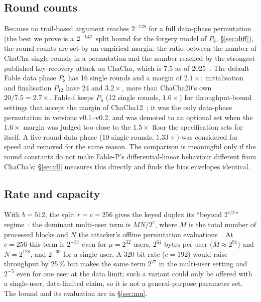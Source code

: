 \documentclass{iacrtrans}
\newcommand{\Fable}{\textsf{Fable}\xspace}
\newcommand{\FableP}{\textsf{Fable-P}\xspace}
\newcommand{\FableF}{\textsf{Fable-f}\xspace}
\newcommand{\ChaCha}{\textsf{ChaCha}\xspace}
\newcommand{\PP}[1]{P_{#1}}
\newcommand{\WrateTwo}{42}   %
\newcommand{\WuncTwo}{33}    %
\newcommand{\BoundEight}{\the\numexpr\WrateTwo+3*\WuncTwo\relax}   %
\begin{document}
\subsection{Round counts}
\label{sec:whyrounds}
Because no trail-based argument reaches $2^{-128}$ for a full data-phase permutation (the best we prove is a $2^{-\BoundEight}$ split bound for the forgery model of $\PP{8}$, \S\ref{sec:diff}), the round counts are set by an empirical margin: the ratio between the number of \ChaCha single rounds in a permutation and the number reached by the strongest published key-recovery attack on \ChaCha, which is 7.5 as of 2025~\cite{FT25,Dey24,SDSM25}. The default \Fable data phase $\PP{8}$ has 16 single rounds and a margin of $2.1\times$; initialisation and finalisation $\PP{12}$ have 24 and $3.2\times$, more than ChaCha20's own $20/7.5 = 2.7\times$. \FableF keeps $\PP{6}$ (12 single rounds, $1.6\times$) for throughput-bound settings that accept the margin of ChaCha12~\cite{Adiantum18}; it was the only data-phase permutation in versions v0.1--v0.2, and was demoted to an optional set when the $1.6\times$ margin was judged too close to the $1.5\times$ floor the specification sets for itself. A five-round data phase (10 single rounds, $1.33\times$) was considered for speed and removed for the same reason. The comparison is meaningful only if the round constants do not make \FableP's differential-linear behaviour different from \ChaCha's; \S\ref{sec:dl} measures this directly and finds the bias envelopes identical.

\subsection{Rate and capacity}
\label{sec:whyrc}
With $b = 512$, the split $r = c = 256$ gives the keyed duplex its ``beyond $2^{c/2}$'' regime~\cite{JLM14}: the dominant multi-user term is $M N / 2^c$, where $M$ is the total number of processed blocks and $N$ the attacker's offline permutation evaluations~\cite{DMV17}. At $c = 256$ this term is $2^{-37}$ even for $\mu = 2^{32}$ users, $2^{64}$ bytes per user ($M \approx 2^{91}$) and $N = 2^{128}$, and $2^{-69}$ for a single user. A 320-bit rate ($c = 192$) would raise throughput by 25\,\% but makes the same term $2^{27}$ in the multi-user setting and $2^{-5}$ even for one user at the data limit; such a variant could only be offered with a single-user, data-limited claim, so it is not a general-purpose parameter set. The bound and its evaluation are in \S\ref{sec:mu}.
\end{document}
